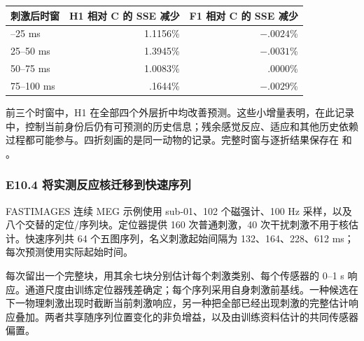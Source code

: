 \documentclass[11pt,a4paper]{article}
\begin{document}

\begingroup
\small

\begin{longtable}[]{@{}lrr@{}}
\toprule\noalign{}
刺激后时窗 & H1 相对 C 的 SSE 减少 & F1 相对 C 的 SSE 减少 \\
\midrule\noalign{}
\endhead
\bottomrule\noalign{}
\endlastfoot
0–25 ms & 1.1156\% & \(-.0024\)\% \\
25–50 ms & 1.3945\% & \(-.0031\)\% \\
50–75 ms & 1.0083\% & .0000\% \\
75–100 ms & .1644\% & \(-.0029\)\% \\
\end{longtable}

\endgroup

前三个时窗中，H1
在全部四个外层折中均改善预测。这些小增量表明，在此记录中，控制当前身份后仍有可预测的历史信息；残余感觉反应、适应和其他历史依赖过程都可能参与。四折刻画的是同一动物的记录。完整时窗与逐折结果保存在
 和
。

\subsubsection{E10.4
将实测反应核迁移到快速序列}\label{e10.4-ux5c06ux5b9eux6d4bux53cdux5e94ux6838ux8fc1ux79fbux5230ux5febux901fux5e8fux5217}

FASTIMAGES 连续 MEG 示例使用 sub-01、102 个磁强计、100 Hz
采样，以及八个交替的定位/序列块。定位器提供 160 次普通刺激，40
次干扰刺激不用于核估计。快速序列共 64 个五图序列，名义刺激起始间隔为
132、164、228、612 ms；每次预测使用实际起始时间。

每次留出一个完整块，用其余七块分别估计每个刺激类别、每个传感器的 0–1 s
响应。通道尺度由训练定位器残差确定；每个序列采用自身刺激前基线。一种候选在下一物理刺激出现时截断当前刺激响应，另一种把全部已经出现刺激的完整估计响应叠加。两者共享随序列位置变化的非负增益，以及由训练资料估计的共同传感器偏置。


\begingroup
\small
\end{document}
